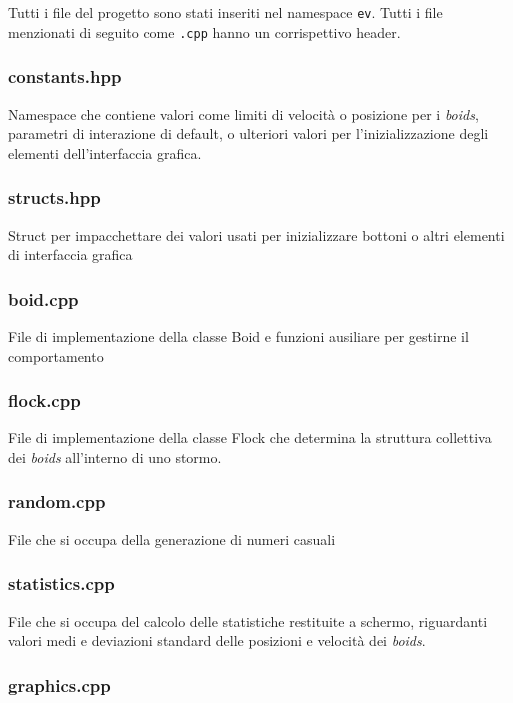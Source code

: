 \documentclass[10pt,a4paper]{article}
\begin{document}
Tutti i file del progetto sono stati inseriti nel namespace \texttt{ev}. Tutti i file menzionati di seguito come \texttt{.cpp} hanno un corrispettivo header.

\subsubsection{constants.hpp}

Namespace che contiene valori come limiti di velocità o posizione per i \textit{boids}, parametri di interazione di default, o ulteriori valori per l'inizializzazione degli elementi dell'interfaccia grafica.

\subsubsection{structs.hpp}

Struct per impacchettare dei valori usati per inizializzare bottoni o altri elementi di interfaccia grafica

\subsubsection{boid.cpp}

File di implementazione della classe Boid e funzioni ausiliare per gestirne il comportamento

\subsubsection{flock.cpp}

File di implementazione della classe Flock che determina la struttura collettiva dei \textit{boids} all'interno di uno stormo.

\subsubsection{random.cpp}

File che si occupa della generazione di numeri casuali

\subsubsection{statistics.cpp}

File che si occupa del calcolo delle statistiche restituite a schermo, riguardanti valori medi e deviazioni standard delle posizioni e velocità dei \textit{boids}.

\subsubsection{graphics.cpp}
\end{document}
